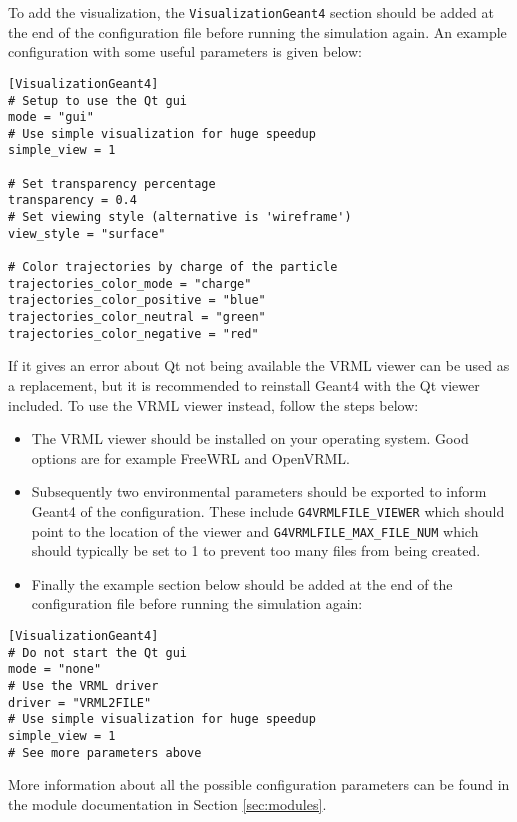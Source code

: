 To add the visualization, the \texttt{VisualizationGeant4} section should be added at the end of the configuration file before running the simulation again. An example configuration with some useful parameters is given below:
\begin{verbatim}
[VisualizationGeant4]
# Setup to use the Qt gui
mode = "gui"
# Use simple visualization for huge speedup
simple_view = 1

# Set transparency percentage
transparency = 0.4
# Set viewing style (alternative is 'wireframe')
view_style = "surface"

# Color trajectories by charge of the particle
trajectories_color_mode = "charge"
trajectories_color_positive = "blue"
trajectories_color_neutral = "green"
trajectories_color_negative = "red"
\end{verbatim}
If it gives an error about Qt not being available the VRML viewer can be used as a replacement, but it is recommended to reinstall Geant4 with the Qt viewer included. To use the VRML viewer instead, follow the steps below:
\begin{itemize}
\item The VRML viewer should be installed on your operating system. Good options are for example FreeWRL and OpenVRML.
\item Subsequently two environmental parameters should be exported to inform Geant4 of the configuration. These include \texttt{G4VRMLFILE\_VIEWER} which should point to the location of the viewer and \texttt{G4VRMLFILE\_MAX\_FILE\_NUM} which should typically be set to 1 to prevent too many files from being created.
\item Finally the example section below should be added at the end of the configuration file before running the simulation again:
\end{itemize}

\begin{verbatim}
[VisualizationGeant4]
# Do not start the Qt gui
mode = "none"
# Use the VRML driver
driver = "VRML2FILE"
# Use simple visualization for huge speedup
simple_view = 1
# See more parameters above
\end{verbatim}

More information about all the possible configuration parameters can be found in the module documentation in Section \ref{sec:modules}.

